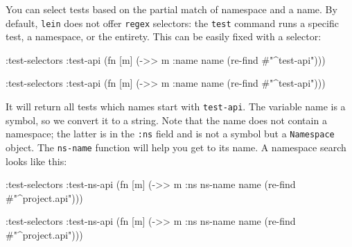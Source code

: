 \fi

You can select tests based on the partial match of namespace and a name. By default, \verb|lein| does not offer \verb|regex| selectors: the \verb|test| command runs a specific test, a namespace, or the entirety. This can be easily fixed with a selector:

\ifx\DEVICETYPE\MOBILE

\begin{english}
  \begin{clojure}
:test-selectors
  {:test-api
   (fn [m]
     (->> m :name name
          (re-find #"^test-api")))}
  \end{clojure}
\end{english}

\else

\begin{english}
  \begin{clojure}
:test-selectors {:test-api
                 (fn [m] (->> m :name name
                              (re-find #"^test-api")))}
  \end{clojure}
\end{english}

\fi

It will return all tests which names start with \verb|test-api|. The variable name is a symbol, so we convert it to a string. Note that the name does not contain a namespace; the latter is in the \verb|:ns| field and is not a symbol but a \verb|Namespace| object. The \verb|ns-name| function will help you get to its name. A namespace search looks like this:


\ifx\DEVICETYPE\MOBILE

\begin{english}
  \begin{clojure}
:test-selectors
  {:test-ns-api
   (fn [m]
     (->> m :ns ns-name name
          (re-find #"^project.api")))}
  \end{clojure}
\end{english}

\else

\begin{english}
  \begin{clojure}
:test-selectors {:test-ns-api
                 (fn [m] (->> m :ns ns-name name
                              (re-find #"^project.api")))}
  \end{clojure}
\end{english}


